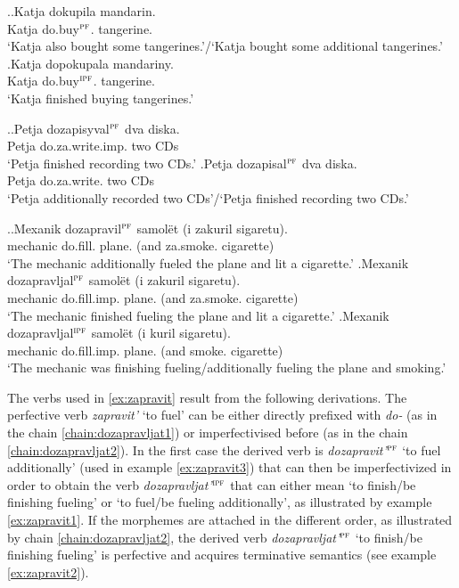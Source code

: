\ex.\ag.\label{ex:do:kupit}Katja dokupila mandarin.\\
Katja do.buy$^{\textsc{pf}}$. tangerine.\\
\trans `Katja also bought some tangerines.'/`Katja bought some additional tangerines.'
\bg.\label{ex:do:pokupat}Katja dopokupala mandariny.\\
Katja do.buy$^{\textsc{ipf}}$. tangerine.\\
\trans `Katja finished buying tangerines.'

\ex.\ag.\label{ex:do:zapisyvat}Petja dozapisyval$^{\textsc{pf}}$ dva diska.\\
Petja do.za.write.imp. two CDs\\
\trans `Petja finished recording two CDs.'
\bg.\label{ex:do:zapisat}Petja dozapisal$^{\textsc{pf}}$ dva diska.\\
Petja do.za.write. two CDs\\
\trans `Petja additionally recorded two CDs'/`Petja finished recording two CDs.'

\ex.\label{ex:zapravit}\ag.\label{ex:zapravit3}Mexanik dozapravil$^{\textsc{pf}}$ samol\"et (i zakuril sigaretu).\\
mechanic do.fill. plane. (and za.smoke. cigarette)\\
\trans `The mechanic additionally fueled the plane and lit a cigarette.'
\bg.\label{ex:zapravit2}Mexanik dozapravljal$^{\textsc{pf}}$ samol\"et (i zakuril sigaretu).\\
mechanic do.fill.imp. plane. (and za.smoke. cigarette)\\
\trans `The mechanic finished fueling the plane and lit a cigarette.'
\bg.\label{ex:zapravit1}Mexanik dozapravljal$^{\textsc{ipf}}$ samol\"et (i kuril sigaretu).\\
mechanic do.fill.imp. plane. (and smoke. cigarette)\\
\trans `The mechanic was finishing fueling/additionally fueling the plane and smoking.'

The verbs used in \ref{ex:zapravit} result from the following derivations. The perfective verb \textit{zapravit'} `to fuel' can be either directly prefixed with \textit{do-} (as in the chain \ref{chain:dozapravljat1}) or imperfectivised before (as in the chain \ref{chain:dozapravljat2}). In the first case the derived verb is \textit{dozapravit'}$^{\textsc{pf}}$ `to fuel additionally' (used in example \ref{ex:zapravit3}) that can then be imperfectivized in order to obtain the verb \textit{dozapravljat'}$^{\textsc{ipf}}$ that can either mean `to finish/be finishing fueling' or `to fuel/be fueling additionally', as illustrated by example \ref{ex:zapravit1}. If the morphemes are attached in the different order, as illustrated by chain \ref{chain:dozapravljat2}, the derived verb \textit{dozapravljat'}$^{\textsc{pf}}$ `to finish/be finishing fueling' is perfective and acquires terminative semantics (see example \ref{ex:zapravit2}).


